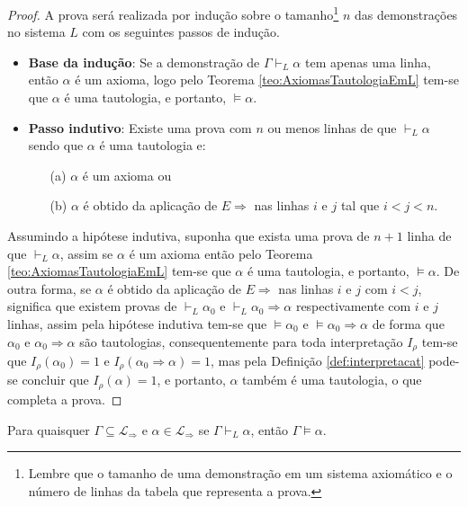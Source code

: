 \begin{proof}
    A prova será realizada por indução sobre o tamanho\footnote{Lembre que o tamanho de uma demonstração em um sistema axiomático e o número de linhas da tabela que representa a prova.} $n$ das demonstrações no sistema $L$ com os seguintes passos de indução. 
    \begin{itemize}
        \item \textbf{Base da indução}: Se a demonstração de $\Gamma \vdash_L \alpha$ tem apenas uma linha, então $\alpha$ é um axioma, logo pelo Teorema \ref{teo:AxiomasTautologiaEmL} tem-se que $\alpha$ é uma tautologia, e portanto, $\vDash \alpha$.
        \item \textbf{Passo indutivo}: Existe uma prova com $n$ ou menos linhas de que $\vdash_L \alpha$ sendo que $\alpha$ é uma tautologia e:
        \begin{itemize}
            \item[(a)]  $\alpha$ é um axioma ou
            \item[(b)] $\alpha$ é obtido da aplicação de $E\Rightarrow$ nas linhas $i$ e $j$ tal que $i < j < n$.
        \end{itemize}
    \end{itemize}
    Assumindo a hipótese indutiva, suponha que exista uma prova de $n+1$ linha de que $\vdash_L \alpha$, assim se $\alpha$ é um axioma então pelo Teorema \ref{teo:AxiomasTautologiaEmL} tem-se que $\alpha$ é uma tautologia, e portanto, $\vDash \alpha$. De outra forma,  se $\alpha$ é obtido da aplicação de $E\Rightarrow$ nas linhas $i$ e $j$ com $i < j$, significa que existem  provas de $\vdash_L \alpha_0$ e $\vdash_L \alpha_0 \Rightarrow \alpha$ respectivamente com $i$ e $j$ linhas, assim pela hipótese indutiva tem-se que $\vDash \alpha_0$ e $\vDash \alpha_0 \Rightarrow \alpha$ de forma que $\alpha_0$ e $\alpha_0 \Rightarrow \alpha$ são tautologias, consequentemente para toda interpretação $I_\rho$ tem-se que $I_\rho(\alpha_0) = 1$ e $I_\rho(\alpha_0 \Rightarrow \alpha) = 1$, mas pela Definição \ref{def:interpretacat} pode-se concluir que $I_\rho(\alpha) = 1$, e portanto, $\alpha$ também é uma tautologia, o que completa a prova.
\end{proof}

\begin{theorem}
    Para quaisquer $\Gamma \subseteq \mathcal{L}_{\Rightarrow}$ e $\alpha \in \mathcal{L}_{\Rightarrow}$ se $\Gamma \vdash_L \alpha$, então $\Gamma \vDash \alpha$.
\end{theorem}

